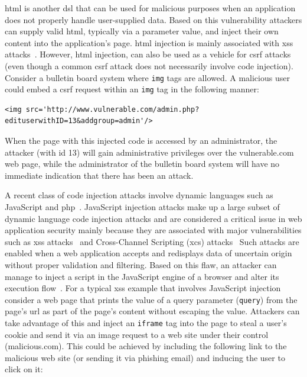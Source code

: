 \documentclass[10pt,journal,compsoc]{IEEEtran}
\begin{document}
{\sc html} is another {\sc dsl} that can be used for malicious
purposes when an application does not properly handle user-supplied
data. Based on this vulnerability attackers can supply valid {\sc
  html}, typically via a parameter value, and inject their own content
into the application's page. {\sc html} injection is mainly associated
with {\sc xss} attacks~\cite{SP11, SLMS14}. However, {\sc html} injection,
can also be used as a vehicle for {\sc csrf} attacks~\cite{BJM08, LZRL09}
(even though a common {\sc csrf} attack does not necessarily
involve code injection).
Consider a bulletin board system where {\tt img} tags are allowed.
A malicious user could embed a {\sc csrf} request within an
{\tt img} tag in the following manner:

\lstset{language=HTML}
\begin{lstlisting}
<img src='http://www.vulnerable.com/admin.php?edituserwithID=13&addgroup=admin'/>
\end{lstlisting}

\noindent
When the page with this injected code is accessed by an administrator,
the attacker (with {\sc id} 13) will gain administrative privileges
over the vulnerable.com web page,
while the administrator of the bulletin board system
will have no immediate indication that there has been an attack.

A recent class of code injection attacks involve dynamic languages
such as JavaScript and {\sc php}~\cite{SFVM09,SMS13}.
JavaScript injection attacks make up a large subset of dynamic
language code injection attacks and are considered a critical issue
in web application security mainly because they are associated with
major vulnerabilities such as {\sc xss} attacks~\cite{SG07} and
Cross-Channel Scripting ({\sc xcs}) attacks~\cite{W10,BBB09}
Such attacks are enabled when a web application accepts
and redisplays data of uncertain origin without
proper validation and filtering. Based on this flaw, an attacker
can manage to inject a script in the JavaScript engine of a browser
and alter its execution flow~\cite{ELX07}.
For a typical {\sc xss} example that involves JavaScript injection
consider a web page that prints the value
of a query parameter ({\tt query}) from the
page's {\sc url} as part of the page's content
without escaping the value. Attackers
can take advantage of this and inject an {\tt iframe} tag
into the page to steal a user's cookie and
send it via an image request to a web site
under their control (malicious.com).
This could be achieved by including the following
link to the malicious web site (or sending it via phishing
email) and inducing the user to click on it:
\end{document}
